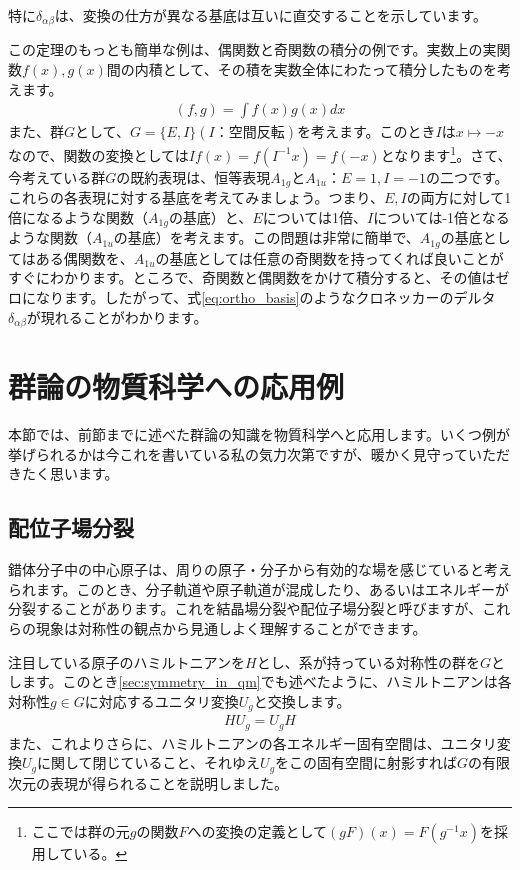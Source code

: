 \documentclass[uplatex,dvipdfmx,a4j,openany]{jsarticle}
\begin{document}
特に$\delta_{\alpha\beta}$は、変換の仕方が異なる基底は互いに直交することを示しています。

この定理のもっとも簡単な例は、偶関数と奇関数の積分の例です。実数上の実関数$f(x),g(x)$間の内積として、その積を実数全体にわたって積分したものを考えます。
\begin{align}
	(f,g) = \int f(x)g(x) dx
\end{align}
また、群$G$として、$G = \{ E, I\} (I：空間反転)$を考えます。このとき$I$は$x\mapsto -x$なので、関数の変換としては$If(x) = f(I^{-1}x)=f(-x)$となります\footnote{ここでは群の元$g$の関数$F$への変換の定義として$(gF)(x) = F(g^{-1}x)$を採用している。}。さて、今考えている群$G$の既約表現は、恒等表現$A_{1g}$と$A_{1u}：E=1, I=-1$の二つです。これらの各表現に対する基底を考えてみましょう。つまり、$E,I$の両方に対して1倍になるような関数（$A_{1g}$の基底）と、$E$については1倍、$I$については-1倍となるような関数（$A_{1u}$の基底）を考えます。この問題は非常に簡単で、$A_{1g}$の基底としてはある偶関数を、$A_{1u}$の基底としては任意の奇関数を持ってくれば良いことがすぐにわかります。ところで、奇関数と偶関数をかけて積分すると、その値はゼロになります。したがって、式\eqref{eq:ortho_basis}のようなクロネッカーのデルタ$\delta_{\alpha\beta}$が現れることがわかります。

\section{群論の物質科学への応用例}
本節では、前節までに述べた群論の知識を物質科学へと応用します。いくつ例が挙げられるかは今これを書いている私の気力次第ですが、暖かく見守っていただきたく思います。

\subsection{配位子場分裂}
錯体分子中の中心原子は、周りの原子・分子から有効的な場を感じていると考えられます。このとき、分子軌道や原子軌道が混成したり、あるいはエネルギーが分裂することがあります。これを結晶場分裂や配位子場分裂と呼びますが、これらの現象は対称性の観点から見通しよく理解することができます。

注目している原子のハミルトニアンを$H$とし、系が持っている対称性の群を$G$とします。このとき\ref{sec:symmetry_in_qm}でも述べたように、ハミルトニアンは各対称性$g \in G$に対応するユニタリ変換$U_g$と交換します。
\begin{align}
	HU_g = U_gH
\end{align}
また、これよりさらに、ハミルトニアンの各エネルギー固有空間は、ユニタリ変換$U_g$に関して閉じていること、それゆえ$U_g$をこの固有空間に射影すれば$G$の有限次元の表現が得られることを説明しました。
\end{document}
